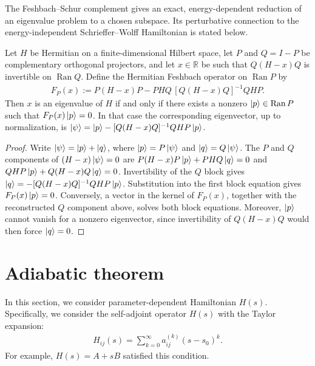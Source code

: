The Feshbach--Schur complement gives an exact, energy-dependent reduction of
an eigenvalue problem to a chosen subspace.  Its perturbative connection to
the energy-independent Schrieffer--Wolff Hamiltonian is stated below.

\begin{theorem}\label{thm:Feshbach}
Let $H$ be Hermitian on a finite-dimensional Hilbert space, let $P$ and
$Q=I-P$ be complementary orthogonal projectors, and let $x\in\mathbb R$ be
such that $Q(H-x)Q$ is invertible on $\operatorname{Ran}Q$.  Define the Hermitian Feshbach operator on $\operatorname{Ran}P$ by
\begin{align}
F_P(x)
:=
P(H-x)P
-PHQ\,[Q(H-x)Q]^{-1}QHP .
\label{eq:Feshbach}
\end{align}
Then $x$ is an eigenvalue of $H$ if and only if there exists a nonzero
$\ket p\in\operatorname{Ran}P$ such that $F_P(x)\ket p=0$.  In that case the
corresponding eigenvector, up to normalization, is
$\ket\psi=\ket p-[Q(H-x)Q]^{-1}QHP\ket p$.
\end{theorem}

\begin{proof}
Write $\ket\psi=\ket p+\ket q$, where $\ket p=P\ket\psi$ and
$\ket q=Q\ket\psi$.  The $P$ and $Q$ components of
$(H-x)\ket\psi=0$ are $P(H-x)P\ket p+PHQ\ket q =0$ and 
$QHP\ket p+Q(H-x)Q\ket q=0$.
Invertibility of the $Q$ block gives
$\ket q=-[Q(H-x)Q]^{-1}QHP\ket p$.
Substitution into the first block equation gives $F_P(x)\ket p=0$.
Conversely, a vector in the kernel of $F_P(x)$, together with the reconstructed
$Q$ component above, solves both block equations.  Moreover, $\ket p$ cannot
vanish for a nonzero eigenvector, since invertibility of $Q(H-x)Q$ would then
force $\ket q=0$.
\end{proof}




\section{Adiabatic theorem}
In this section, we consider parameter-dependent Hamiltonian $H(s)$. Specifically, we consider the self-adjoint operator $H(s)$ with the Taylor expansion:
\begin{align}
    H_{ij}(s) = \sum_{k=0}^{\infty} a_{ij}^{(k)}(s - s_0)^k.
\end{align}
For example, $H(s) = A + s B$ satisfied this condition.

